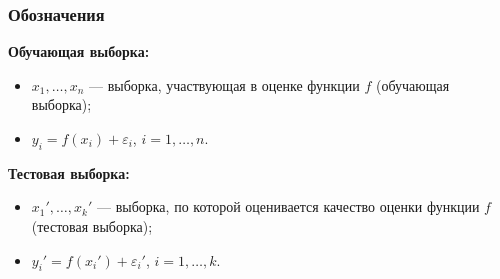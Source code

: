 \documentclass[unicode, notheorems]{beamer}
\newcommand{\R}{\mathbb{R}}
\begin{document}
\begin{frame}
\frametitle{Обозначения}

\textbf{Обучающая выборка:}
\begin{itemize}
\item $x_1, \ldots, x_n$ --- выборка, участвующая в оценке функции $f$ (обучающая выборка);
\item $y_i = f(x_i) + \varepsilon_i$, $i = 1, \ldots, n$.  
\end{itemize} 
\vspace{1cm}

\textbf{Тестовая выборка:}
\begin{itemize}
\item $x_1', \ldots, x_k'$ --- выборка, по которой оценивается качество оценки функции $f$ (тестовая выборка);
\item $y_i' = f(x_i') + \varepsilon_i'$, $i = 1, \ldots, k$.  
\end{itemize} 
\end{frame}

%
%
%
%
%
%
%
\end{document}
